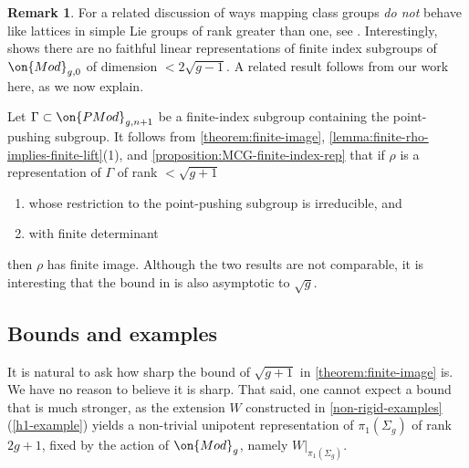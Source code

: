 \documentclass[12 pt]{amsart}
\theoremstyle{plain}
\theoremstyle{definition}
\newtheorem{remark}[subsubsection]{Remark}
\theoremstyle{remark}
\numberwithin{equation}{section}
\begin{document}
\begin{remark}\label{remark:FLM-rank-1-result}
	For a related discussion of ways mapping class groups \emph{do not} behave like lattices in simple Lie groups of rank greater than one, see \cite{farbLM:rank-1-phenomena}. Interestingly, \cite[Theorem 1.6]{farbLM:rank-1-phenomena} shows there are no faithful linear
representations of finite index subgroups of $\on{Mod}_{g,0}$ of dimension $< 2 \sqrt{g-1}$. A related result follows from our work here, as we now explain.

Let $\Gamma\subset \on{PMod}_{g,n+1}$ be a finite-index subgroup containing the point-pushing subgroup. 
It follows from \autoref{theorem:finite-image},
\autoref{lemma:finite-rho-implies-finite-lift}(1), and
\autoref{proposition:MCG-finite-index-rep}
that if $\rho$ is a representation of $\Gamma$ of rank $<\sqrt{g+1}$ 
\begin{enumerate}
\item 	whose restriction to the point-pushing subgroup is irreducible, and
\item with finite determinant
\end{enumerate}
then $\rho$ has finite image.
Although the two results are not comparable,
it is interesting that the bound in
\cite{farbLM:rank-1-phenomena} is also asymptotic to $\sqrt{g}$. 
\end{remark}

\subsection{Bounds and examples}\label{question:bounds}
It is natural to ask how sharp the bound of $\sqrt{g+1}$ in
\autoref{theorem:finite-image} is. We have no reason to believe it is sharp.
That said, one cannot expect a bound that is much stronger, as the extension
$W$ constructed in \autoref{non-rigid-examples}(\ref{h1-example}) yields a
non-trivial unipotent representation of $\pi_1(\Sigma_g)$ of rank $2g+1$, fixed
by the action of $\on{Mod}_g$, namely $W|_{\pi_1(\Sigma_g)}$.  
\end{document}
